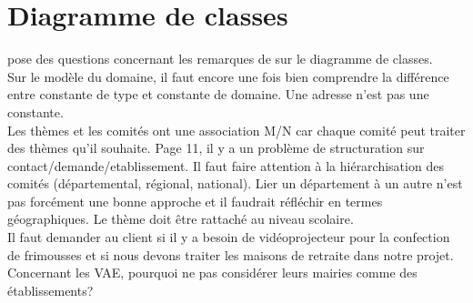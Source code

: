 \documentclass [a4paper] {article}
\begin{document}
\section{Diagramme de classes}
\Julie{} pose des questions concernant les remarques de \nomTuteurPedago{} sur le diagramme de classes.\\
Sur le modèle du domaine, il faut encore une fois bien comprendre la différence entre constante de type et constante de domaine. Une adresse n'est pas une constante. \\
Les thèmes et les comités ont une association M/N car chaque comité peut traiter des thèmes qu'il souhaite. Page 11, il y a un problème de structuration sur contact/demande/etablissement. Il faut faire attention à la hiérarchisation des comités (départemental, régional, national). Lier un département à un autre n'est pas forcément une bonne approche et il faudrait réfléchir en termes géographiques. Le thème doit être rattaché au niveau scolaire.\\
Il faut demander au client si il y a besoin de vidéoprojecteur pour la confection de frimousses et si nous devons traiter les maisons de retraite dans notre projet. Concernant les VAE, pourquoi ne pas considérer leurs mairies comme des établissements?


\newpage
\end{document}
